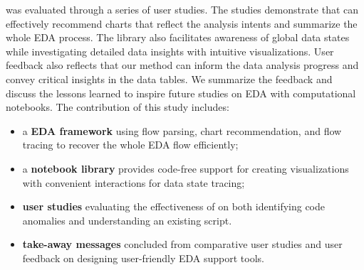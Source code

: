 \system{} was evaluated through a series of user studies.
The studies demonstrate that \system{} can effectively recommend charts that reflect the analysis intents and summarize the whole EDA process.
The library also facilitates awareness of global data states while investigating detailed data insights with intuitive visualizations.
User feedback also reflects that our method can inform the data analysis progress and convey critical insights in the data tables.
We summarize the feedback and discuss the lessons learned to inspire future studies on EDA with computational notebooks.
The contribution of this study includes:
\begin{itemize}[leftmargin=*]
    \item a \textbf{EDA framework} using flow parsing, chart recommendation, and flow tracing to recover the whole EDA flow efficiently; 
    \item a \textbf{notebook library} provides code-free support for creating visualizations with convenient interactions for data state tracing;
    \item \textbf{user studies} evaluating the effectiveness of \system{} on both identifying code anomalies and understanding an existing script.
    \item \textbf{take-away messages} concluded from comparative user studies and user feedback on designing user-friendly EDA support tools.
\end{itemize}






